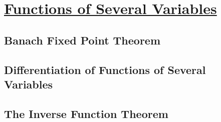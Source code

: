 \section[Functions of Several Variables]{\hyperlink{toc}{Functions of Several Variables}}

\subsection{Banach Fixed Point Theorem}

\subsection{Differentiation of Functions of Several Variables}

\subsection{The Inverse Function Theorem}

